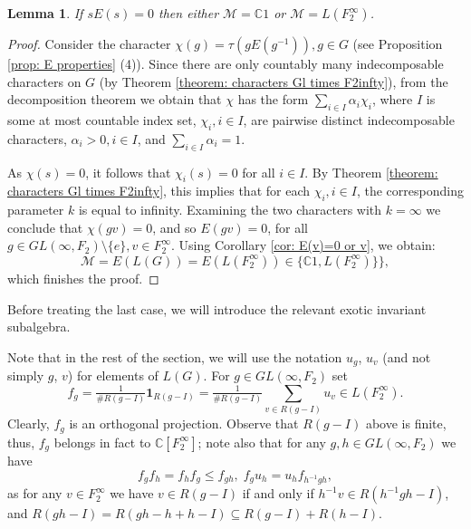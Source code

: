 \documentclass[11pt]{amsart}
\theoremstyle{plain}
\newtheorem{lemma}[theorem]{Lemma}
\theoremstyle{definition}
\theoremstyle{remark}
\numberwithin{equation}{section}
\begin{document}
\begin{lemma}\label{prop: (01 10)E((01 10))=0}
 If $sE(s)=0$ then either $\mathcal M=\mathbb C 1$ or $\mathcal M=L(F_2^\infty)$.
\end{lemma}
\begin{proof}
	Consider the character $\chi(g)=\tau(gE(g^{-1})), g \in G$ (see Proposition \ref{prop: E properties} (4)). Since there are only countably many indecomposable characters on $G$ (by Theorem \ref{theorem: characters Gl times F2infty}),  from the decomposition theorem we obtain that $\chi$ has the form $\sum\limits_{i\in I}\alpha_i\chi_i$, where $I$ is some at most countable index set, $\chi_i,i\in I$, are pairwise distinct indecomposable characters, $\alpha_i>0,i\in I$, and $\sum\limits_{i\in I}\alpha_i=1$.

As $\chi(s)=0$, it follows that $\chi_i(s)=0$ for all $i\in I$. By Theorem \ref{theorem: characters Gl times F2infty}, this implies that for each $\chi_i, i\in I$, the corresponding parameter $k$ is equal to infinity. %
Examining the two characters with $k=\infty$ we conclude that $\chi(gv)=0$, and so $E(gv)=0$, for all $g\in GL(\infty, F_2)\setminus\{e\},v\in F_2^\infty$. Using Corollary  \ref{cor: E(v)=0 or v}, we obtain:
$$\mathcal M=E(L(G))=E(L(F_2^\infty))\in\{\mathbb C1,L(F_2^\infty)\}\},$$ which finishes the proof.	
\end{proof}

Before treating the last case, we will introduce the relevant exotic invariant subalgebra.


Note that in the rest of the section, we will use the notation $u_g$, $u_v$ (and not simply $g$, $v$) for elements of $L(G)$.
For $g\in GL(\infty, F_2)$ set %
\begin{equation}\label{eq: f_g}
	f_g=\tfrac{1}{\# R(g-I)}\mathbf{1}_{R(g-I)}=\tfrac{1}{\# R(g-I)}\sum\limits_{v\in R(g-I)}u_v\in L(F_2^\infty).
\end{equation} 
Clearly, $f_g$ is an orthogonal projection. Observe that $R(g-I)$ above is finite, thus, $f_g$ belongs in fact to $\mathbb C[F_2^\infty]$; note also that for any $g,h \in GL(\infty,F_2)$ we have 
\begin{equation}\label{eq: f_g commutation}
	f_gf_h=f_hf_g\leqslant f_{gh},\; f_g u_h = u_h f_{h^{-1}gh},
\end{equation} 
as for any $v \in F_2^\infty$ we have $v \in R(g-I)$ if and only if $h^{-1}v \in R(h^{-1}gh - I)$, and $R(gh-I)=R(gh-h+h-I)\subseteq R(g-I)+R(h-I)$. 
\end{document}
